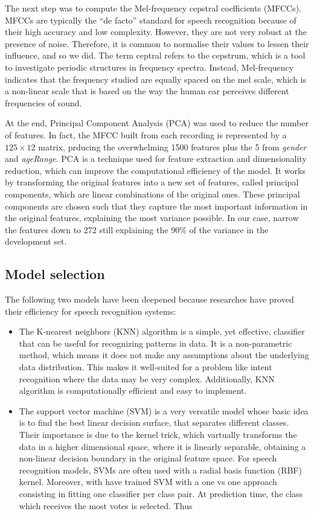 \documentclass[conference]{IEEEtran}
\begin{document}
The next step was to compute the Mel-frequency cepstral coefficients (MFCCs).
MFCCs are typically the “de facto” standard for speech recognition because of their high accuracy and low complexity.
However, they are not very robust at the presence of noise.
Therefore, it is common to normalise their values to lessen their influence, and so we did.
The term ceptral refers to the cepstrum, which is a tool to investigate periodic structures in frequency spectra.
Instead, Mel-frequency indicates that the frequency studied are equally spaced on the mel scale, which is a non-linear scale that is based on the way the human ear perceives different frequencies of sound.

At the end, Principal Component Analysis (PCA) was used to reduce the number of features.
In fact, the MFCC built from each recording is represented by a $125 \times 12$ matrix, prducing the overwhelming 1500 features plus the 5 from \textit{gender} and \textit{ageRange}.
PCA is a technique used for feature extraction and dimensionality reduction, which can improve the computational efficiency of the model.
It works by transforming the original features into a new set of features, called principal components, which are linear combinations of the original ones.
These principal components are chosen such that they capture the most important information in the original features, explaining the most variance possible.
In our case, narrow the features down to 272 still explaining the 90\% of the variance in the development set.

\subsection{Model selection}
The following two models have been deepened because researches have proved their efficiency for speech recognition systems:
\begin{itemize}
    \item The K-nearest neighbors (KNN) algorithm is a simple, yet effective, classifier that can be useful for recognizing patterns in data.
    It is a non-parametric method, which means it does not make any assumptions about the underlying data distribution.
    This makes it well-suited for a problem like intent recognition where the data may be very complex.
    Additionally, KNN algorithm is computationally efficient and easy to implement.

    \item The support vector machine (SVM) is a very versatile model whose basic idea is to find the best linear decision surface, that separates different classes.
    Their importance is due to the kernel trick, which vartually transforms the data in a higher dimensional space, where it is linearly separable, obtaining a non-linear decision boundary in the original feature space.
    For speech recognition models, SVMs are often used with a radial basis function (RBF) kernel.
    Moreover, with have trained SVM with a one vs one approach consisting in fitting one classifier per class pair.
    At prediction time, the class which receives the most votes is selected.
    Thus
\end{itemize}
\end{document}
